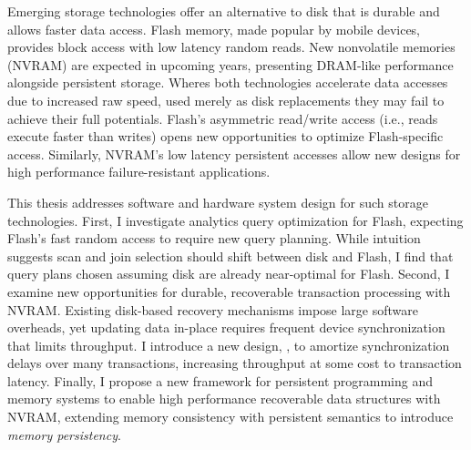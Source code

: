 Emerging storage technologies offer an alternative to disk that is durable and allows faster data access.
Flash memory, made popular by mobile devices, provides block access with low latency random reads.
New nonvolatile memories (NVRAM) are expected in upcoming years, presenting DRAM-like performance alongside persistent storage.
Wheres both technologies accelerate data accesses due to increased raw speed, used merely as disk replacements they may fail to achieve their full potentials.
Flash's asymmetric read/write access (i.e., reads execute faster than writes) opens new opportunities to optimize Flash-specific access.
Similarly, NVRAM's low latency persistent accesses allow new designs for high performance failure-resistant applications.

This thesis addresses software and hardware system design for such storage technologies.
First, I investigate analytics query optimization for Flash, expecting Flash's fast random access to require new query planning.
While intuition suggests scan and join selection should shift between disk and Flash, I find that query plans chosen assuming disk are already near-optimal for Flash.
Second, I examine new opportunities for durable, recoverable transaction processing with NVRAM.
Existing disk-based recovery mechanisms impose large software overheads, yet updating data in-place requires frequent device synchronization that limits throughput.
I introduce a new design, \GroupCommit, to amortize synchronization delays over many transactions, increasing throughput at some cost to transaction latency.
Finally, I propose a new framework for persistent programming and memory systems to enable high performance recoverable data structures with NVRAM, extending memory consistency with persistent semantics to introduce \emph{memory persistency}.
